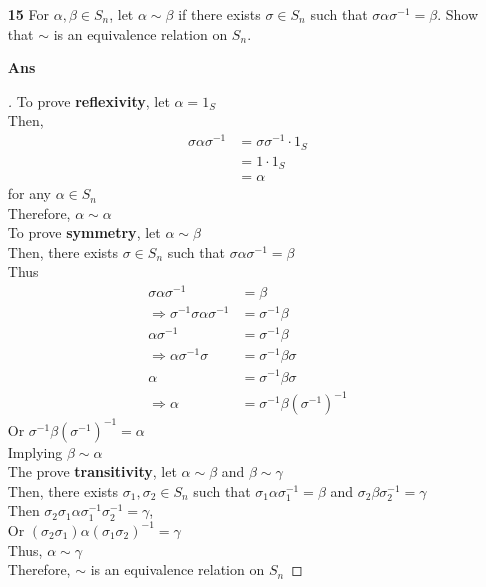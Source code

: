 \documentclass[paper=usletter, fontsize=12pt]{article}
\begin{document}
\begin{itemize}
\begin{itemize}
            \item[\textbf{15}] For $\alpha, \beta \in S_n$, let
            $\alpha\sim\beta$ if there exists $\sigma \in S_n$ such that
            $\sigma\alpha\sigma^{-1}=\beta$. Show that $\sim$ is an equivalence
            relation on $S_n$.
            \item[\textbf{Ans}]
            \begin{proof}[\unskip\nopunct]
                To prove \textbf{reflexivity}, let $\alpha = 1_S$\\
                Then,
                \begin{align*}
                    \sigma\alpha\sigma^{-1} & = \sigma\sigma^{-1}\cdot 1_S\\
                    & = 1 \cdot 1_S\\
                    & = \alpha
                \end{align*}
                for any $\alpha \in S_n$\\
                Therefore, $\alpha \sim \alpha$\\

                To prove \textbf{symmetry}, let $\alpha \sim \beta$\\
                Then, there exists $\sigma \in S_n$ such that $\sigma\alpha\sigma^{-1} = \beta$\\
                Thus
                \begin{align*}
                    \sigma\alpha\sigma^{-1} &= \beta \\
                    \Rightarrow \sigma^{-1}\sigma\alpha\sigma^{-1} &= \sigma^{-1}\beta\\
                    \alpha\sigma^{-1} &= \sigma^{-1}\beta\\
                    \Rightarrow \alpha\sigma^{-1}\sigma &= \sigma^{-1}\beta\sigma\\
                    \alpha &= \sigma^{-1}\beta\sigma\\
                    \Rightarrow \alpha &= \sigma^{-1}\beta(\sigma^{-1})^{-1}
                \end{align*}
                Or $\sigma^{-1}\beta(\sigma^{-1})^{-1} = \alpha$\\
                Implying $\beta \sim \alpha$\\

                The prove \textbf{transitivity}, let $\alpha \sim \beta$ and
                $\beta \sim \gamma$\\
                Then, there exists $\sigma_1, \sigma_2 \in S_n$ such that
                $\sigma_1\alpha\sigma_1^{-1} = \beta$ and
                $\sigma_2\beta\sigma_2^{-1} = \gamma$\\
                Then $\sigma_2\sigma_1\alpha\sigma_1^{-1}\sigma_2^{-1} =
                \gamma$,\\
                Or $(\sigma_2\sigma_1)\alpha(\sigma_1\sigma_2)^{-1} =
                \gamma$\\
                Thus, $\alpha \sim \gamma$\\
                Therefore, $\sim$ is an equivalence relation on $S_n$ \qedhere


\end{proof}
\end{itemize}
\end{itemize}
\end{document}
